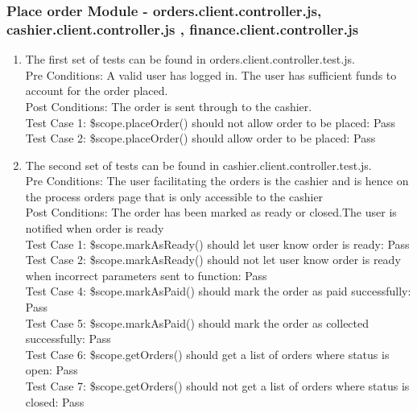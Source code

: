 \documentclass[a4paper,12pt]{report}
\begin{document}
\subsubsection{Place order Module - orders.client.controller.js, cashier.client.controller.js , finance.client.controller.js}
\begin{enumerate}

\item The first set of tests can be found in orders.client.controller.test.js.\\
Pre Conditions: A valid user has logged in. The user has sufficient funds to account for the order placed.\\
Post Conditions: The order is sent through to the cashier. \\
Test Case 1: \$scope.placeOrder() should not allow order to be placed: Pass\\
Test Case 2: \$scope.placeOrder() should allow order to be placed: Pass\\

\item The second set of tests can be found in cashier.client.controller.test.js.\\
Pre Conditions: The user facilitating the orders is the cashier and is hence on the process orders page that is only accessible to the cashier\\
Post Conditions: The order has been marked as ready or closed.The user is notified when order is ready\\
Test Case 1: \$scope.markAsReady() should let user know order is ready: Pass\\
Test Case 2: \$scope.markAsReady() should not let user know order is ready when incorrect parameters sent to function: Pass \\
Test Case 4: \$scope.markAsPaid() should  mark the order as paid successfully: Pass \\
Test Case 5: \$scope.markAsPaid() should  mark the order as collected successfully: Pass \\
Test Case 6: \$scope.getOrders() should get a list of orders where status is open: Pass \\
Test Case 7: \$scope.getOrders() should not get a list of orders where status is closed: Pass \\


\end{enumerate}
\end{document}
